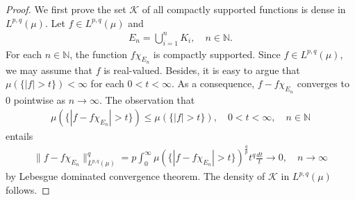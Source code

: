 \documentclass[10pt,reqno]{amsart}
\numberwithin{equation}{section}
\begin{document}
\begin{proof}
We first prove the set $\mathcal{K}$ of all compactly supported functions is dense in $L^{p,q}(\mu)$. Let $f\in L^{p,q}(\mu)$ and 
\begin{align*}
E_{n}=\bigcup_{i=1}^{n}K_{i},\quad n\in\mathbb{N}.
\end{align*}
For each $n\in\mathbb{N}$, the function $f\chi_{E_{n}}$ is compactly supported. Since $f\in L^{p,q}(\mu)$, we may assume that $f$ is real-valued. Besides, it is easy to argue that $\mu(\{|f|>t\})<\infty$ for each $0<t<\infty$. As a consequence,  $f-f\chi_{E_{n}}$ converges to $0$ pointwise as $n\rightarrow\infty$. The observation that 
\begin{align*}
\mu(\{|f-f\chi_{E_{n}}|>t\})\leq\mu(\{|f|>t\}),\quad 0<t<\infty,\quad n\in\mathbb{N}
\end{align*}
entails
\begin{align*}
\|f-f\chi_{E_{n}}\|_{L^{p,q}(\mu)}^{q}=p\int_{0}^{\infty}\mu(\{|f-f\chi_{E_{n}}|>t\})^{\frac{q}{p}}t^{q}\frac{dt}{t}\rightarrow 0,\quad n\rightarrow\infty
\end{align*}
by Lebesgue dominated convergence theorem. The density of $\mathcal{K}$ in $L^{p,q}(\mu)$ follows.


\end{proof}
\end{document}
